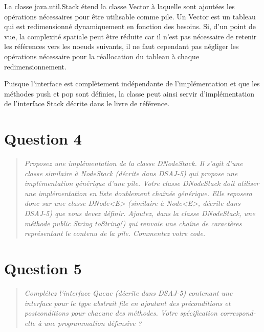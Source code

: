 \documentclass[11pt,a4paper]{article}
\begin{document}
La classe java.util.Stack étend la classe Vector à laquelle sont ajoutées les opérations nécessaires pour être utilisable comme pile. Un Vector est un tableau qui est redimensionné dynamiquement en fonction des besoins. Si, d'un point de vue, la complexité spatiale peut être réduite car il n'est pas nécessaire de retenir les références vers les noeuds suivants, il ne faut cependant pas négliger les opérations nécessaire pour la réallocation du tableau à chaque redimensionnement. 

Puisque l'interface est complètement indépendante de l'implémentation et que les méthodes push et pop sont définies, la classe peut ainsi servir d'implémentation de l'interface Stack décrite dans le livre de référence.

\section{Question 4}
\begin{quotation}
\textit{Proposez une implémentation de la classe DNodeStack. Il s’agit d’une classe
similaire à NodeStack (décrite dans DSAJ-5) qui propose une implémentation
générique d’une pile. Votre classe DNodeStack doit utiliser une implémentation en liste doublement chaînée générique. Elle reposera donc sur une classe
DNode<E> (similaire à Node<E>, décrite dans DSAJ-5) que vous devez définir.
Ajoutez, dans la classe DNodeStack, une méthode public String toString()
qui renvoie une chaîne de caractères représentant le contenu de la pile. Commentez votre code.}
\end{quotation}




%

\section{Question 5}
\begin{quotation}
\textit{Complétez l'interface Queue (décrite dans DSAJ-5) contenant une interface pour le type abstrait file en ajoutant des préconditions et postconditions pour chacune des méthodes. Votre spécification correspond-elle à une programmation défensive ?}
\end{quotation}


%
\end{document}
